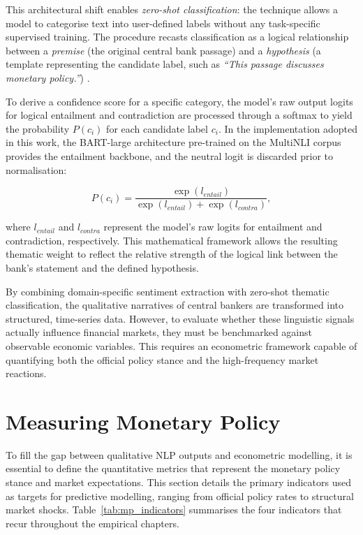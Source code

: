 This architectural shift enables \textit{zero-shot classification}: the technique allows a model to categorise text into user-defined labels without any task-specific supervised training. The procedure recasts classification as a logical relationship between a \textit{premise} (the original central bank passage) and a \textit{hypothesis} (a template representing the candidate label, such as \textit{``This passage discusses monetary policy.''}) \cite{yin2019benchmarking}.

To derive a confidence score for a specific category, the model's raw output logits for logical entailment and contradiction are processed through a softmax to yield the probability $P(c_i)$ for each candidate label $c_i$. In the implementation adopted in this work, the BART-large architecture pre-trained on the MultiNLI corpus \cite{lewis2019bart} provides the entailment backbone, and the neutral logit is discarded prior to normalisation:

\begin{equation}
    P(c_i) = \frac{\exp({l_{entail}})}{\exp({l_{entail}}) + \exp({l_{contra}})},
\end{equation}

where $l_{entail}$ and $l_{contra}$ represent the model's raw logits for entailment and contradiction, respectively. This mathematical framework allows the resulting thematic weight to reflect the relative strength of the logical link between the bank's statement and the defined hypothesis.

By combining domain-specific sentiment extraction with zero-shot thematic classification, the qualitative narratives of central bankers are transformed into structured, time-series data. However, to evaluate whether these linguistic signals actually influence financial markets, they must be benchmarked against observable economic variables. This requires an econometric framework capable of quantifying both the official policy stance and the high-frequency market reactions.

\section{Measuring Monetary Policy}
To fill the gap between qualitative NLP outputs and econometric modelling, it is essential to define the quantitative metrics that represent the monetary policy stance and market expectations. This section details the primary indicators used as targets for predictive modelling, ranging from official policy rates to structural market shocks. Table~\ref{tab:mp_indicators} summarises the four indicators that recur throughout the empirical chapters.

